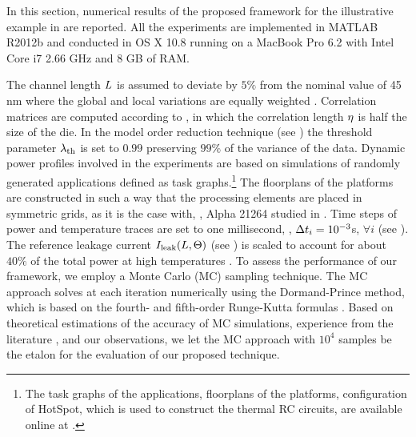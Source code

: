 In this section, numerical results of the proposed framework for the illustrative example in  are reported. All the experiments are implemented in MATLAB R2012b \cite{matlab} and conducted in OS X 10.8 running on a MacBook Pro 6.2 with Intel Core i7 2.66 GHz and 8 GB of RAM.

The channel length $L$ is assumed to deviate by $5\%$ from the nominal value of 45 nm where the global and local variations are equally weighted \cite{juan2011, juan2012}. Correlation matrices are computed according to , in which the correlation length $\eta$ is half the size of the die. In the model order reduction technique (see ) the threshold parameter $\lambda_\text{th}$ is set to $0.99$ preserving $99\%$ of the variance of the data. Dynamic power profiles involved in the experiments are based on simulations of randomly generated applications defined as task graphs.\footnote{The task graphs of the applications, floorplans of the platforms, configuration of HotSpot, which is used to construct the thermal RC circuits, are available online at \cite{sources}.} The floorplans of the platforms are constructed in such a way that the processing elements are placed in symmetric grids, as it is the case with, \eg, Alpha 21264 studied in \cite{juan2011}. Time steps of power and temperature traces are set to one millisecond, \ie, $\Delta t_i = 10^{-3}$s, $\forall i$ (see ). The reference leakage current $I_{\text{leak}}(L, \Theta)$ (see ) is scaled to account for about $40\%$ of the total power at high temperatures \cite{liu2007}. To assess the performance of our framework, we employ a Monte Carlo (MC) sampling technique. The MC approach solves  at each iteration numerically using the Dormand-Prince method, which is based on the fourth- and fifth-order Runge-Kutta formulas \cite{press2007}. Based on theoretical estimations \cite{diaz-emparanza2002} of the accuracy of MC simulations, experience from the literature \cite{xiu2010, eldred2009, maitre2010, shen2009}, and our observations, we let the MC approach with $10^4$ samples be the etalon for the evaluation of our proposed technique.

